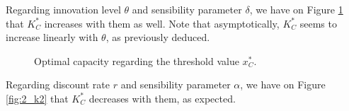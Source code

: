 Regarding innovation level $\theta$ and sensibility parameter $\delta$, we have on Figure \ref{fig:2_k3} that $K^*_C$ increases with them as well. Note that asymptotically, $K^*_C$ seems to increase linearly with $\theta$, as previously deduced.

\begin{figure}[!htb]
	\begin{subfigmatrix}{2}
	\end{subfigmatrix}
	\caption{Optimal capacity regarding the threshold value $x^*_C$.}
	\label{fig:2_k3}
\end{figure}

Regarding discount rate $r$ and sensibility parameter $\alpha$, we have on Figure \ref{fig:2_k2} that $K^*_C$ decreases with them, as expected.  

